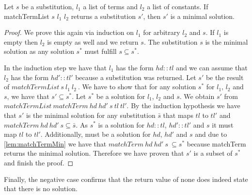 \begin{lemma}[\matchTermListFindsMinimalSolution]
    Let $s$ be a substitution, $l_1$ a list of terms and $l_2$ a list of constants. If matchTermList $s$ $l_1$ $l_2$ returns a substitution $s'$, then $s'$ is a minimal solution.
\end{lemma}
\begin{proof}
    We prove this again via induction on $l_1$ for arbitrary $l_2$ and $s$. If $l_1$ is empty then $l_2$ is empty as well and we return $s$. The substitution $s$ is the minimal solution as any solution $s^\ast$ must fulfill $s \subseteq s^\ast$.

    In the induction step we have that $l_1$ has the form $hd::tl$ and we can assume that $l_2$ has the form $hd'::tl'$ because a substitution was returned. Let $s'$ be the result of $matchTermList\ s\ l_1\ l_2\ $. We have to show that for any solution $s^\ast$ for $l_1$, $l_2$ and $s$, we have that $s' \subseteq s^\ast$.
    Let $s^\ast$ be a solution for $l_1$, $l_2$ and $s$.
    We obtain $s'$ from $matchTermList\ matchTerm\ hd\ hd'\ s\ tl\ tl'$. By the induction hypothesis we have that $s'$ is the minimal solution for any substitution $\bar{s}$ that maps $tl$ to $tl'$ and $matchTerm\ hd\ hd'\ s \subseteq \bar{s}$. As $s^\ast$ is a solution for $hd::tl$, $hd'::tl'$ and $s$ it must map $tl$ to $tl'$. Additionally, must be a solution for $hd$, $hd'$ and $s$ and due to \cref{lem:matchTermMin} we have that $matchTerm\ hd\ hd'\ s\ \subseteq s^\ast$ because matchTerm returns the minimal solution. Therefore we have proven that $s'$ is a subset of $s^\ast$ and finish the proof.
\end{proof}

Finally, the negative case confirms that the return value of none does indeed state that there is no solution.

